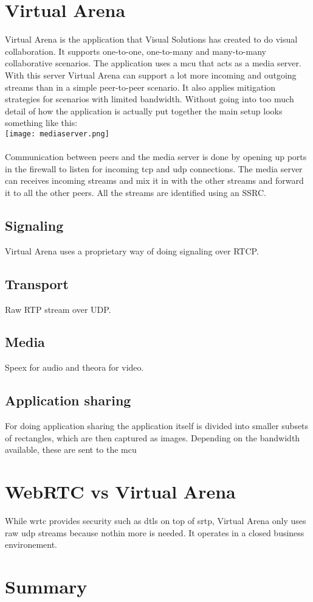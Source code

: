 \section{Virtual Arena}
Virtual Arena is the application that Visual Solutions has created to do visual collaboration\cite{VirtualArena}. It supports one-to-one, one-to-many and many-to-many collaborative scenarios. The application uses a \gls{mcu} that acts as a media server. With this server Virtual Arena can support a lot more incoming and outgoing streams than in a simple peer-to-peer scenario. It also applies mitigation strategies for scenarios with limited bandwidth. Without going into too much detail of how the application is actually put together the main setup looks something like this: 
\\
\texttt{[image: mediaserver.png]}
\\
\\
Communication between peers and the media server is done by opening up ports in the firewall to listen for incoming tcp and udp connections. The media server can receives incoming streams and mix it in with the other streams and forward it to all the other peers. All the streams are identified using an SSRC.

\subsection{Signaling}
Virtual Arena uses a proprietary way of doing signaling over RTCP.

\subsection{Transport}
Raw RTP stream over UDP.

\subsection{Media}
Speex for audio and theora for video.

\subsection{Application sharing}
For doing application sharing the application itself is divided into smaller subsets of rectangles, which are then captured as images. Depending on the bandwidth available, these are sent to the \gls{mcu}

\section{WebRTC vs Virtual Arena}
While \gls{wrtc} provides security such as \gls{dtls} on top of \gls{srtp}, Virtual Arena only uses raw \gls{udp} streams because nothin more is needed. It operates in a closed business environement.

\section{Summary}

